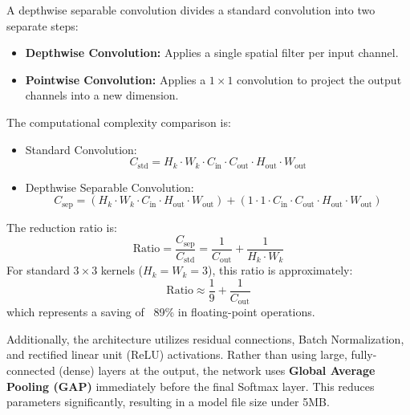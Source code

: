 A depthwise separable convolution divides a standard convolution into two separate steps:
\begin{itemize}
    \item \textbf{Depthwise Convolution:} Applies a single spatial filter per input channel.
    \item \textbf{Pointwise Convolution:} Applies a $1 \times 1$ convolution to project the output channels into a new dimension.
\end{itemize}
The computational complexity comparison is:
\begin{itemize}
    \item Standard Convolution:
    \begin{equation}
        C_{\text{std}} = H_k \cdot W_k \cdot C_{\text{in}} \cdot C_{\text{out}} \cdot H_{\text{out}} \cdot W_{\text{out}}
    \end{equation}
    \item Depthwise Separable Convolution:
    \begin{equation}
        C_{\text{sep}} = (H_k \cdot W_k \cdot C_{\text{in}} \cdot H_{\text{out}} \cdot W_{\text{out}}) + (1 \cdot 1 \cdot C_{\text{in}} \cdot C_{\text{out}} \cdot H_{\text{out}} \cdot W_{\text{out}})
    \end{equation}
\end{itemize}
The reduction ratio is:
\begin{equation}
    \text{Ratio} = \frac{C_{\text{sep}}}{C_{\text{std}}} = \frac{1}{C_{\text{out}}} + \frac{1}{H_k \cdot W_k}
\end{equation}
For standard $3 \times 3$ kernels ($H_k = W_k = 3$), this ratio is approximately:
\begin{equation}
    \text{Ratio} \approx \frac{1}{9} + \frac{1}{C_{\text{out}}}
\end{equation}
which represents a saving of ~89\% in floating-point operations.

Additionally, the architecture utilizes residual connections, Batch Normalization, and rectified linear unit (ReLU) activations. Rather than using large, fully-connected (dense) layers at the output, the network uses \textbf{Global Average Pooling (GAP)} immediately before the final Softmax layer. This reduces parameters significantly, resulting in a model file size under 5MB.

